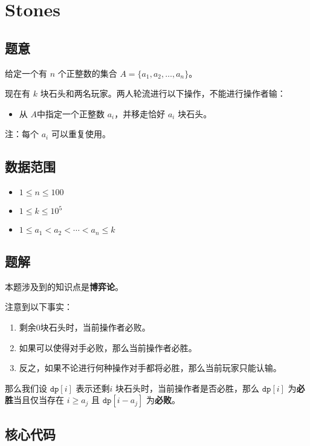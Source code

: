 \section{Stones}
\subsection*{题意}
 给定一个有 $n$ 个正整数的集合 $A = \{ a_1, a_2, \ldots, a_n \}$。
 
 现在有 $k$ 块石头和两名玩家。两人轮流进行以下操作，不能进行操作者输：
 
\begin{itemize}
\item 从 $A$中指定一个正整数 $a_i$，并移走恰好 $a_i$ 块石头。
\end{itemize}

注：每个 $a_i$ 可以重复使用。
\subsection*{数据范围}

\begin{itemize}
\item $1 \leq n \leq 100$
\item $1 \leq k \leq 10^5$
\item $1 \leq a_1 < a_2 < \cdots < a_n \leq k$
\end{itemize}

\subsection*{题解}

本题涉及到的知识点是\textbf{博弈论}。

注意到以下事实：
\begin{enumerate}
\item 剩余$0$块石头时，当前操作者必败。
\item 如果可以使得对手必败，那么当前操作者必胜。
\item 反之，如果不论进行何种操作对手都将必胜，那么当前玩家只能认输。
\end{enumerate}
那么我们设 ${\texttt{dp}[i]}$ 表示还剩$i$ 块石头时，当前操作者是否必胜，那么 ${\texttt{dp}[i]}$ 为\textbf{必胜}当且仅当存在 $i\ge a_j$ 且 ${\texttt{dp}}[i-a_j]$ 为\textbf{必败}。







\subsection*{核心代码}
\inputminted[linenos,autogobble]{cpp}{./Code/K.cpp}
\newpage